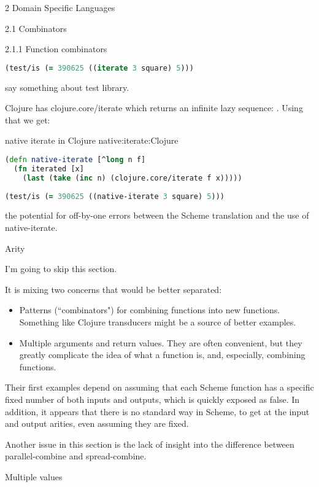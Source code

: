 \documentclass[11pt]{PalisadesLakesBook}
\begin{document}
\begin{plSection}{}
\begin{plSection}{2 Domain Specific Languages}
\begin{plSection}{2.1 Combinators}
\begin{plSection}{2.1.1 Function combinators}
\begin{plListing}
\begin{lstlisting}[language=clojure]
(test/is (= 390625 ((iterate 3 square) 5)))
\end{lstlisting}
\end{plListing}
\TODO say something about {\clojureFont test} library.

Clojure has {\clojureFont clojure.core/iterate} 
which returns an infinite lazy sequence:
{\clojureFont [(f x) (f (f x)) \ldots]}.
Using that we get:
\begin{plListing}
{native {\clojureFont iterate} in Clojure}
{native:iterate:Clojure}
\begin{lstlisting}[language=clojure]
(defn native-iterate [^long n f]
  (fn iterated [x] 
    (last (take (inc n) (clojure.core/iterate f x)))))
    
(test/is (= 390625 ((native-iterate 3 square) 5)))
\end{lstlisting}
\end{plListing}
\NOTE the potential for off-by-one errors between the Scheme
translation and the use of {\clojureFont native-iterate}.

\begin{plSection}{Arity}

I'm going to skip this section.

It is mixing two concerns that would be better separated:
\begin{itemize}
  \item Patterns (``combinators")
  for combining functions into new functions.
  Something like Clojure transducers might be a source of 
  better examples.
  \item Multiple arguments and return values. 
  They are often convenient, but they greatly complicate 
  the idea of what a function is, and, especially,
  combining functions.
  
\end{itemize}
Their first examples depend on assuming that each Scheme function
has a specific fixed number of both inputs and outputs, 
which is quickly exposed as false. 
In addition, it appears that there is no standard way 
in Scheme,
to get at the input and output arities, even assuming they are 
fixed.

Another issue in this section is the lack of insight
into the difference between {\schemeFont parallel-combine}
and {\schemeFont spread-combine}. 

\end{plSection}%
\begin{plSection}{Multiple values}\label{Multiple:values}


\end{plSection}
\end{plSection}
\end{plSection}
\end{plSection}
\end{plSection}
\end{document}
